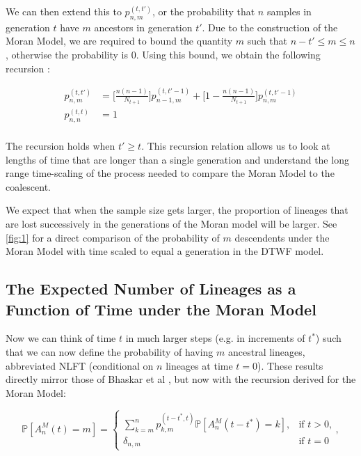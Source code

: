 \documentclass[10.5pt]{article}
\begin{document}
We can then extend this to $p^{(t, t')}_{n,m}$, or the probability that $n$ samples in generation $t$ have $m$  ancestors in generation $t'$. Due to the construction of the Moran Model, we are required to bound the quantity $m$ such that $n - t' \leq m \leq n$, otherwise the probability is $0$. Using this bound, we obtain the following recursion :

\begin{equation}
\begin{aligned}
	p^{(t, t')}_{n,m} &= \Bigg[\frac{n(n-1)}{N_{t+1}}\Bigg] p^{(t, t'-1)}_{n-1, m} + \Bigg[1 - \frac{n(n-1)}{N_{t+1}}\Bigg] p^{(t, t'-1)}_{n,m}\\
	p^{(t, t)}_{n,n} &= 1\\
\end{aligned}
\end{equation}

The recursion holds when $t' \geq t$. This recursion relation allows us to look at lengths of time that are longer than a single generation and understand the long range time-scaling of the process needed to compare the Moran Model to the coalescent.

We expect that when the sample size gets larger, the proportion of lineages that are lost successively in the generations of the Moran model will be larger. See \ref{fig:1} for a direct comparison of the probability of $m$ descendents under the Moran Model with time scaled to equal a generation in the DTWF model.

\subsection{The Expected Number of Lineages as a Function of Time under the Moran Model}

Now we can think of time $t$ in much larger steps (e.g. in increments of $t^*$) such that we can now define the probability of having $m$ ancestral lineages, abbreviated NLFT (conditional on $n$ lineages at time $t = 0$). These results directly mirror those of Bhaskar et al \citet{Bhaskar2014}, but now with the recursion derived for the Moran Model:

\begin{equation}
 \mathbb{P}[A^M_n(t) = m] =
 \begin{cases}
	 \sum^n_{k=m}  p^{(t-t^*, t)}_{k,m} \mathbb{P}[A^M_n (t-t^*) = k],  &\text{if $t > 0$,}
 	 \\
	 \delta_{n,m} &\text{if $t = 0$}
 \end{cases},
\end{equation}
\end{document}
